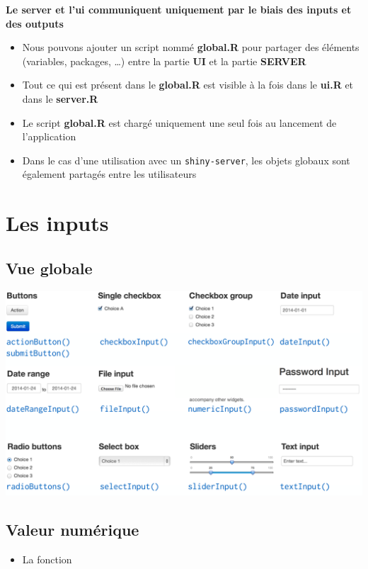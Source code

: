 \documentclass[]{article}
\providecommand{\tightlist}{%
  \setlength{\itemsep}{0pt}\setlength{\parskip}{0pt}}
\begin{document}
\textbf{Le server et l'ui communiquent uniquement par le biais des
inputs et des outputs}

\begin{itemize}
\item
  Nous pouvons ajouter un script nommé \textbf{global.R} pour partager
  des éléments (variables, packages, \ldots{}) entre la partie
  \textbf{UI} et la partie \textbf{SERVER}
\item
  Tout ce qui est présent dans le \textbf{global.R} est visible à la
  fois dans le \textbf{ui.R} et dans le \textbf{server.R}
\item
  Le script \textbf{global.R} est chargé uniquement une seul fois au
  lancement de l'application
\item
  Dans le cas d'une utilisation avec un \texttt{shiny-server}, les
  objets globaux sont également partagés entre les utilisateurs
\end{itemize}

\section{Les inputs}\label{les-inputs}

\subsection{Vue globale}\label{vue-globale}

\includegraphics{img/all_input.png}

\subsection{Valeur numérique}\label{valeur-numerique}

\begin{itemize}
\tightlist
\item
  La fonction
\end{itemize}
\end{document}
